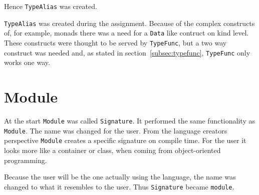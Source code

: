 Hence \verb|TypeAlias| was created.

\verb|TypeAlias| was created during the assignment.
Because of the complex constructs of, for example, monads there was a need for a \verb|Data| like contruct on kind level.
These constructs were thought to be served by \verb|TypeFunc|, but a two way construct was needed and, as stated in section~\ref{subsec:typefunc}, \verb|TypeFunc| only works one way.

\section{Module}
At the start \verb|Module| was called \verb|Signature|.
It performed the same functionality as \verb|Module|.
The name was changed for the user.
From the language creators perspective \verb|Module| creates a specific signature on compile time.
For the user it looks more like a container or class, when coming from object-oriented programming.

Because the user will be the one actually using the language, the name was changed to what it resembles to the user.
Thus \verb|Signature| became \verb|module|.
